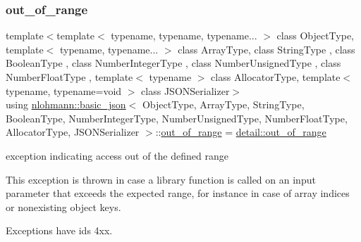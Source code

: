 \subsubsection{\texorpdfstring{out\+\_\+of\+\_\+range}{out\_of\_range}}
{\footnotesize\ttfamily template$<$template$<$ typename, typename, typename... $>$ class Object\+Type, template$<$ typename, typename... $>$ class Array\+Type, class String\+Type , class Boolean\+Type , class Number\+Integer\+Type , class Number\+Unsigned\+Type , class Number\+Float\+Type , template$<$ typename $>$ class Allocator\+Type, template$<$ typename, typename=void $>$ class J\+S\+O\+N\+Serializer$>$ \\
using \hyperlink{classnlohmann_1_1basic__json}{nlohmann\+::basic\+\_\+json}$<$ Object\+Type, Array\+Type, String\+Type, Boolean\+Type, Number\+Integer\+Type, Number\+Unsigned\+Type, Number\+Float\+Type, Allocator\+Type, J\+S\+O\+N\+Serializer $>$\+::\hyperlink{classnlohmann_1_1basic__json_a28f7c2f087274a0012eb7a2333ee1580}{out\+\_\+of\+\_\+range} =  \hyperlink{classnlohmann_1_1detail_1_1out__of__range}{detail\+::out\+\_\+of\+\_\+range}}



exception indicating access out of the defined range 

This exception is thrown in case a library function is called on an input parameter that exceeds the expected range, for instance in case of array indices or nonexisting object keys.

Exceptions have ids 4xx.

